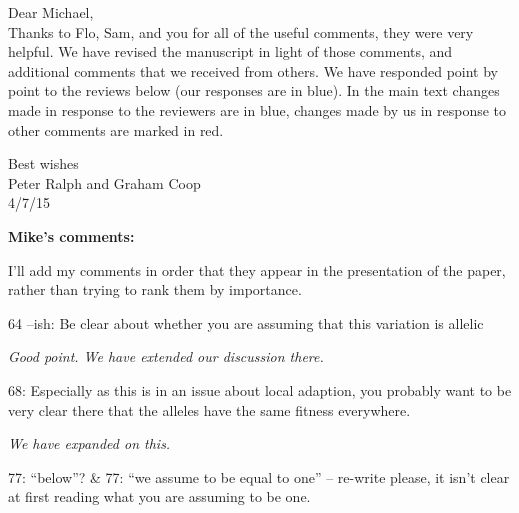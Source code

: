 \documentclass[12pt,letterpaper]{article}
\newcommand{\response}[1]{\emph{ \color{blue} #1}}
\begin{document}
Dear Michael,\\
Thanks to Flo, Sam, and you for all of the useful comments, they were very helpful. We have revised the manuscript in light of those comments, and additional comments that we received from others. We have responded point by point to the reviews below (our responses are in blue). In the main text changes made in response to the reviewers are in blue, changes made by us in response to other comments are marked in red.

 
Best wishes\\
Peter Ralph and Graham Coop\\
4/7/15
\newpage 









{\bf Mike's comments:}

I'll add my comments in order that they appear in the presentation of the paper, rather than trying to rank them by importance.

64 --ish: Be clear about whether you are assuming that this variation is allelic

\response{Good point. We have extended our discussion there. }


68: Especially as this is in an issue about local adaption, you probably want to be very clear there that the alleles have the same fitness everywhere.

\response{We have expanded on this.}

77: ``below''? \& 77: ``we assume to be equal to one'' -- re-write please, it isn't clear at first reading what you are assuming to be one.
\end{document}
